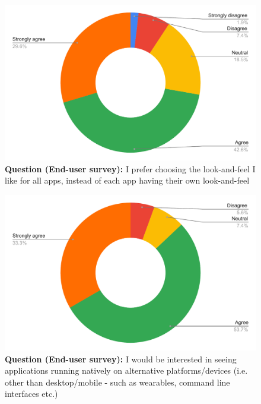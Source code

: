 \begin{figure}[H]
  \centering
  \includegraphics[width=13cm]{thesis/paper/images/p2u_q8.pdf}
  \textbf{Question (End-user survey):} I prefer choosing the look-and-feel I like for all apps, instead of each app having their own look-and-feel
\end{figure}

\begin{figure}[H]
  \centering
  \includegraphics[width=13cm]{thesis/paper/images/p2u_q9.pdf}
  \textbf{Question (End-user survey):} I would be interested in seeing applications running natively on alternative platforms/devices (i.e. other than desktop/mobile - such as wearables, command line interfaces etc.)
\end{figure}

